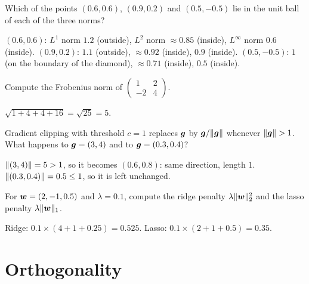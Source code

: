 \begin{exercise}
Which of the points $(0.6, 0.6)$, $(0.9, 0.2)$ and $(0.5, -0.5)$ lie in the
unit ball of each of the three norms?
\end{exercise}
\begin{solution}
$(0.6, 0.6)$: $L^1$ norm $1.2$ (outside), $L^2$ norm $\approx0.85$ (inside),
$L^\infty$ norm $0.6$ (inside). $(0.9, 0.2)$: $1.1$ (outside), $\approx 0.92$
(inside), $0.9$ (inside). $(0.5, -0.5)$: $1$ (on the boundary of the
diamond), $\approx0.71$ (inside), $0.5$ (inside).
\end{solution}

\begin{exercise}
Compute the Frobenius norm of $\left(\begin{smallmatrix} 1 & 2\\ -2 &
4\end{smallmatrix}\right)$.
\end{exercise}
\begin{solution}
$\sqrt{1 + 4 + 4 + 16} = \sqrt{25} = 5$.
\end{solution}

\begin{exercise}
Gradient clipping with threshold $c = 1$ replaces $\bm{g}$ by $\bm{g}/\lVert\bm{g}\rVert$
whenever $\lVert\bm{g}\rVert > 1$. What happens to $\bm{g} = (3, 4)$ and to
$\bm{g} = (0.3, 0.4)$?
\end{exercise}
\begin{solution}
$\lVert(3,4)\rVert = 5 > 1$, so it becomes $(0.6, 0.8)$: same direction, length
$1$. $\lVert(0.3, 0.4)\rVert = 0.5 \le 1$, so it is left unchanged.
\end{solution}

\begin{exercise}
For $\bm{w} = (2, -1, 0.5)$ and $\lambda = 0.1$, compute the ridge penalty
$\lambda\lVert\bm{w}\rVert_2^2$ and the lasso penalty $\lambda\lVert\bm{w}\rVert_1$.
\end{exercise}
\begin{solution}
Ridge: $0.1 \times (4 + 1 + 0.25) = 0.525$. Lasso:
$0.1 \times (2 + 1 + 0.5) = 0.35$.
\end{solution}

\section{Orthogonality}\label{sec:orthogonality}

